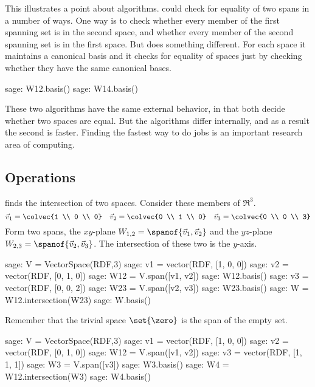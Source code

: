 This illustrates a point about algorithms.
\Sage{} could check for equality of two spans in a number of ways.
One way is to check whether every member of the first spanning set is in the
second space, and whether every member of the second spanning set is in the 
first space. 
But \Sage{} does something different.
For each space it maintains a canonical basis
and it checks for equality of spaces
just by checking whether they have the same canonical bases.
\begin{sagecommandline}
sage: W12.basis()
sage: W14.basis()
\end{sagecommandline}
These two algorithms 
have the same external behavior, in that both decide whether
two spaces are equal.
But the algorithms differ internally, and as a result the second is faster.
Finding the fastest way to do jobs is an important research area of computing.


\subsection{Operations}
\Sage{} finds the intersection of two spaces.
Consider these members of $\Re^3$.
\begin{equation*}
  \vec{v}_1=\colvec{1 \\ 0 \\ 0}
  \quad \vec{v}_2=\colvec{0 \\ 1 \\ 0}
  \quad \vec{v}_3=\colvec{0 \\ 0 \\ 3}
\end{equation*}
Form two spans, the $xy$-plane $W_{1,2}=\spanof{\vec{v}_1, \vec{v}_2}$ 
and the $yz$-plane $W_{2,3}=\spanof{\vec{v}_2, \vec{v}_3}$.
The intersection of these two is the $y$-axis. 
\begin{sagecommandline}
sage: V = VectorSpace(RDF,3)
sage: v1 = vector(RDF, [1, 0, 0])
sage: v2 =  vector(RDF, [0, 1, 0])
sage: W12 = V.span([v1, v2])
sage: W12.basis()
sage: v3 = vector(RDF, [0, 0, 2])
sage: W23 = V.span([v2, v3])
sage: W23.basis()
sage: W = W12.intersection(W23)
sage: W.basis()
\end{sagecommandline}

Remember that the trivial space $\set{\zero}$ is the span of the empty set.
\begin{sagecommandline}
sage: V = VectorSpace(RDF,3)
sage: v1 = vector(RDF, [1, 0, 0])
sage: v2 =  vector(RDF, [0, 1, 0])
sage: W12 = V.span([v1, v2])
sage: v3 = vector(RDF, [1, 1, 1])
sage: W3 = V.span([v3])
sage: W3.basis()
sage: W4 = W12.intersection(W3)
sage: W4.basis()
\end{sagecommandline}

